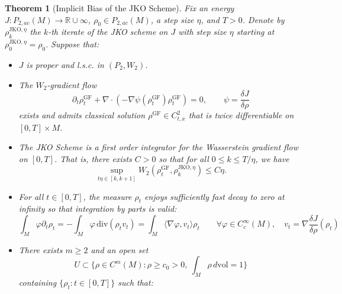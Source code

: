 \documentclass[reqno,11pt,letterpaper]{amsart}
\theoremstyle{plain}
\newtheorem{theorem}{Theorem}
\theoremstyle{definition}
\theoremstyle{remark}
\newcommand{\wass}{\mathrm{GF}}
\newcommand{\wadel}{\frac{\delta J}{\delta \rho}}
\newcommand{\lr}[1]{\left(#1\right)}
\newcommand{\norm}[1]{\left\lVert#1\right\rVert}
\begin{document}
\begin{theorem}[Implicit Bias of the JKO Scheme]\label{thm:main}
    Fix an energy $J: P_{2,ac}(M) \to \mathbb{R} \cup \infty$, $\rho_0\in P_{2,ac}(M)$, a step size $\eta$, and $T>0$. Denote by $\rho_k^{\mathrm{JKO}, \eta}$ the $k$-th iterate of the JKO scheme on $J$ with step size $\eta$ starting at $\rho_0^{\mathrm{JKO},\eta}=\rho_0.$ Suppose that:
    \begin{itemize}
           \item[\textbf{(A1)}] $J$ is proper and l.s.c. in $(P_2,W_2)$.
    \item[\textbf{(A2)}] The $W_{2}$-gradient flow 
    \[
    \partial_{t}\rho^{\wass}_{t} +\nabla \cdot ( -\nabla \psi(\rho_{t}^{\wass})\rho_{t}^{\wass}) =0,\qquad \psi = \frac{\delta J}{\delta \rho}
    \]
    exists and admits classical solution $\rho^{\wass}\in C_{t,x}^{2}$ that is twice differentiable on $[0,T]\times M$.
    \item[\textbf{(A3)}] The JKO Scheme is a first order integrator for the Wasserstein gradient flow on $[0,T]$. That is, there exists $C>0$ so that for all $0\leq k\leq T/\eta$, we have
    \[
    \sup_{t\eta\in [k,k+1]} W_2\lr{\rho_t^\wass, \rho_k^{\mathrm{JKO},\eta}} \leq C \eta.
    \]
    \item[\textbf{(A4)}] For all $t\in [0,T]$, the measure $\rho_{t}$ enjoys sufficiently fast decay to zero at infinity so that integration by parts is valid:
    \[
    \int_M \varphi \partial_{t} \rho_{t} = - \int_M \varphi\, \mathrm{div}(\rho_{t} v_{t}) = \int_M \langle \nabla \varphi , v_{t} \rangle \rho_{t}\qquad \forall \varphi \in C_c^\infty(M),\quad v_t = \nabla \frac{\delta J}{\delta \rho}(\rho_t)
    \]
    \item[\textbf{(A5)}] 
There exists $m\ge 2$ and an open set
\[
U \subset \Big\{\rho\in C^{m}(M): \rho\ge c_0>0,\ \int_M \rho\,d\mathrm{vol}=1\Big\}
\]
containing $\{\rho_t: t\in[0,T]\}$ such that:


\end{itemize}
\end{theorem}
\end{document}
